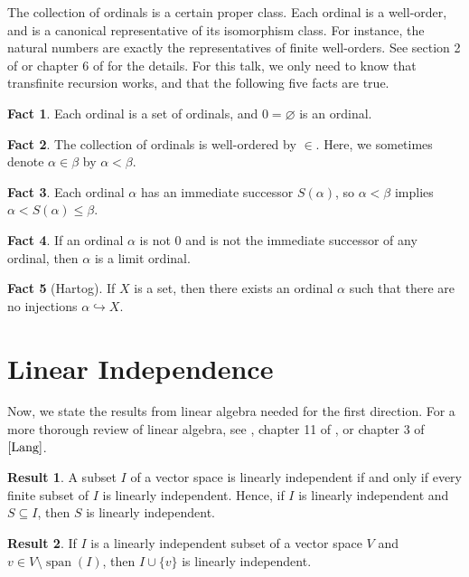 \documentclass[12pt]{article}
\DeclareMathOperator{\spn}{span}
\let\emptyset\varnothing
\theoremstyle{definition}
\newtheorem{fact}{\color{blue} Fact}
\newtheorem{result}{\color{blue} Result}
\begin{document}
The collection of ordinals is a certain proper class. Each ordinal is a well-order, and is a canonical representative of its isomorphism class. For instance, the natural numbers are exactly the representatives of finite well-orders. See section 2 of \cite{Chua} or chapter 6 of \cite{HrbacekJech} for the details. For this talk, we only need to know that transfinite recursion works, and that the following five facts are true.

\begin{fact}
	Each ordinal is a set of ordinals, and $0=\emptyset$ is an ordinal. 
\end{fact}
\begin{fact}
	The collection of ordinals is well-ordered by $\in$. Here, we sometimes denote $\alpha\in\beta$ by $\alpha<\beta$.
\end{fact}
\begin{fact}
	Each ordinal $\alpha$ has an immediate successor $S(\alpha)$, so $\alpha<\beta$ implies $\alpha <S(\alpha)\leq\beta$.
\end{fact}
\begin{fact}
	If an ordinal $\alpha$ is not $0$ and is not the immediate successor of any ordinal, then $\alpha$ is a limit ordinal.
\end{fact}
\begin{fact}[Hartog]
	If $X$ is a set, then there exists an ordinal $\alpha$ such that there are no injections $\alpha\hookrightarrow X$.
\end{fact}

\section*{Linear Independence}

Now, we state the results from linear algebra needed for the first direction. For a more thorough review of linear algebra, see \cite{Kuang}, chapter 11 of \cite{DummitFoote}, or chapter 3 of $\cite{Lang}$.

\begin{result}
	A subset $I$ of a vector space is linearly independent if and only if every finite subset of $I$ is linearly independent. Hence, if $I$ is linearly independent and $S\subseteq I$, then $S$ is linearly independent.
\end{result}
\begin{result}
	If $I$ is a linearly independent subset of a vector space $V$ and $v\in V\setminus\spn(I)$, then $I\cup\{v\}$ is linearly independent.
\end{result}
\end{document}
